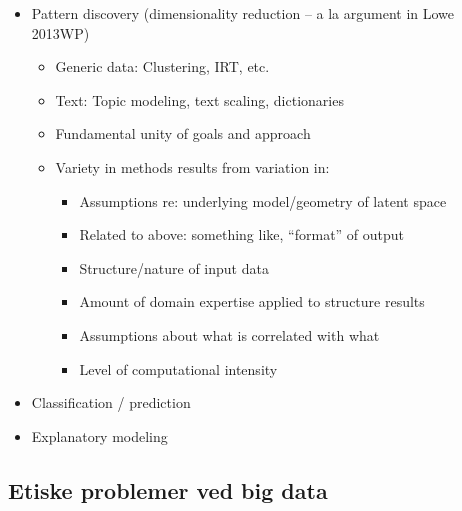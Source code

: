 \documentclass[12pt,]{article}
\providecommand{\tightlist}{%
  \setlength{\itemsep}{0pt}\setlength{\parskip}{0pt}}
\begin{document}
\begin{itemize}
\item
  Pattern discovery (dimensionality reduction -- a la argument in Lowe
  2013WP)

  \begin{itemize}
  \tightlist
  \item
    Generic data: Clustering, IRT, etc.
  \item
    Text: Topic modeling, text scaling, dictionaries
  \item
    Fundamental unity of goals and approach
  \item
    Variety in methods results from variation in:

    \begin{itemize}
    \tightlist
    \item
      Assumptions re: underlying model/geometry of latent space
    \item
      Related to above: something like, ``format'' of output
    \item
      Structure/nature of input data
    \item
      Amount of domain expertise applied to structure results
    \item
      Assumptions about what is correlated with what
    \item
      Level of computational intensity
    \end{itemize}
  \end{itemize}
\item
  Classification / prediction
\item
  Explanatory modeling
\end{itemize}

\hypertarget{etiske-problemer-ved-big-data}{%
\subsection{Etiske problemer ved big
data}\label{etiske-problemer-ved-big-data}}


\end{document}
